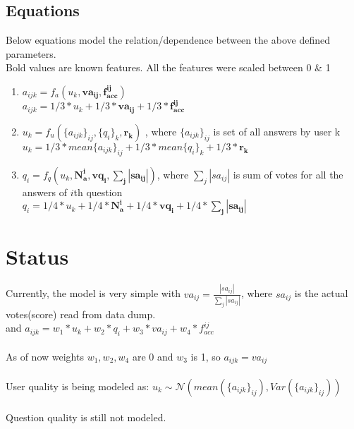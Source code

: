 \documentclass{article}
\begin{document}
\subsection{Equations}
Below equations model the relation/dependence between
the above defined parameters. \\
Bold values are known features.
All the features were scaled between 0 \& 1 \\
\begin{enumerate}
    \item $a_{ijk} = f_a(u_k, \mathbf{va_{ij}}, \mathbf{f_{acc}^{ij}})$ \\
        $a_{ijk} = 1/3*u_k + 1/3*\mathbf{va_{ij}} + 1/3*\mathbf{f_{acc}^{ij}}$
    \item $u_k = f_u(\{a_{ijk}\}_{ij}, \{q_i\}_k, \mathbf{r_k})$ , where $\{a_{ijk}\}_{ij}$
        is set of all answers by user k\\
        $u_k = 1/3*mean\{a_{ijk}\}_{ij} + 1/3*mean\{q_i\}_k + 1/3*\mathbf{r_k}$
    \item $q_i = f_q(u_k, \mathbf{N_{a}^{i}}, \mathbf{vq_i}, \mathbf{\sum_{j} |sa_{ij}|})$, where $\sum_{j} |sa_{ij}|$
        is sum of votes for all the answers of $i$th question \\
        $q_i = 1/4*u_k + 1/4*\mathbf{N_{a}^{i}}+ 1/4* \mathbf{vq_i} + 1/4*\mathbf{\sum_{j} |sa_{ij}|}$
\end{enumerate}

\section{Status}
Currently, the model is very simple with $va_{ij} = \frac{|sa_{ij}|}{\sum_{j} |sa_{ij}|}$, where $sa_{ij}$ is the actual votes(score) read from data dump.\\
and $a_{ijk} = w_1*u_k + w_2*q_i + w_3*va_{ij} + w_4*f_{acc}^{ij}$ \\
\\
As of now weights $w_1, w_2, w_4$ are 0 and $w_3$ is 1, so $a_{ijk} = va_{ij}$ \\
\\
User quality is being modeled as: $u_k \sim \mathcal{N} (mean(\{a_{ijk}\}_{ij}), Var(\{a_{ijk}\}_{ij}))$ \\
\\
Question quality is still not modeled.
\end{document}
